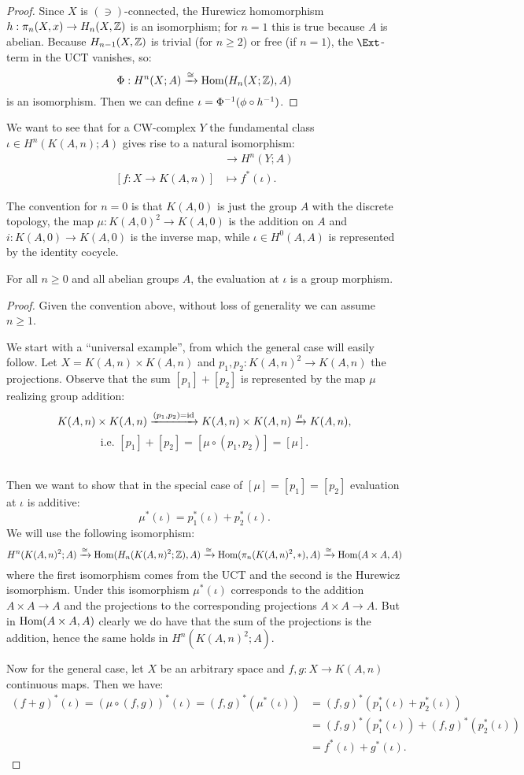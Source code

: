 \begin{proof}
Since $X$ is $(\ni)$-connected, the Hurewicz homomorphism $h:\pi_n(X,x)\to H_n(X,{\mathbb Z})$ is an isomorphism; for $n=1$ this is true because $A$ is abelian. Because $H_{n-1}(X,{\mathbb Z})$ is trivial (for $n\ge2$) or free (if $n=1$), the $\Ext$-term in the UCT vanishes, so:
\[\Phi:H^n(X;A)\xrightarrow{\cong}\operatorname{Hom}(H_n(X;{\mathbb Z}),A)\]
is an isomorphism. Then we can define $\iota=\Phi^\inv(\phi\circ h^\inv)$.
\end{proof}

We want to see that for a CW-complex $Y$ the fundamental class $\iota\in H^n(K(A,n);A)$ gives rise to a natural isomorphism:
\begin{align*}
[Y,K(A,n)]&\to H^n(Y;A)\\
[f:X\to K(A,n)]&\mapsto f^*(\iota).
\end{align*}

The convention for $n=0$ is that $K(A,0)$ is just the group $A$ with the discrete topology, the map $\mu:K(A,0)^2\to K(A,0)$ is the addition on $A$ and $i: K(A,0)\to K(A,0)$ is the inverse map, while $\iota\in H^0(A,A)$ is represented by the identity cocycle.

\begin{theorem}
For all $n\ge0$ and all abelian groups $A$, the evaluation at $\iota$ is a group morphism.
\end{theorem}

\begin{proof}
Given the convention above, without loss of generality we can assume $n\ge1$.

We start with a \enquote{universal example}, from which the general case will easily follow. Let $X=K(A,n)\times K(A,n)$ and $p_1,p_2:K(A,n)^2\to K(A,n)$ the projections. Observe that the sum $[p_1]+[p_2]$ is represented by the map $\mu$ realizing group addition:
\[
K(A,n)\times K(A,n)\xrightarrow{(p_1,p_2)=\operatorname{id}}K(A,n)\times K(A,n)\xrightarrow{\mu}K(A,n),\]
\[\text{i.e. } [p_1]+[p_2]=[\mu\circ(p_1,p_2)]=[\mu].
\]\ 

Then we want to show that in the special case of $[\mu]=[p_1]=[p_2]$ evaluation at $\iota$ is additive:
\[\mu^*(\iota)=p_1^*(\iota)+p_2^*(\iota).\]
We will use the following isomorphism:
{\small
\[ H^n(K(A,n)^2;A)\xrightarrow{\cong}\operatorname{Hom}(H_n(K(A,n)^2;{\mathbb Z}),A)\xrightarrow{\cong}\operatorname{Hom}(\pi_n(K(A,n)^2,*),A)\xrightarrow{\cong}\operatorname{Hom}(A\times A,A)\]}
where the first isomorphism comes from the UCT and the second is the Hurewicz isomorphism. Under this isomorphism $\mu^*(\iota)$ corresponds to the addition $A\times A\to A$ and the projections to the corresponding projections $A\times A\to A$. But in $\operatorname{Hom}(A\times A,A)$ clearly we do have that the sum of the projections is the addition, hence the same holds in $H^n(K(A,n)^2;A)$.

Now for the general case, let $X$ be an arbitrary space and $f,g:X\to K(A,n)$ continuous maps. Then we have:
\begin{align*}
(f+g)^*(\iota)=(\mu\circ(f,g))^*(\iota)=(f,g)^*(\mu^*(\iota))&=(f,g)^*(p_1^*(\iota)+p_2^*(\iota))\\
&=(f,g)^*(p_1^*(\iota))+(f,g)^*(p_2^*(\iota))\\
&=f^*(\iota)+g^*(\iota).
\end{align*}
\end{proof}

